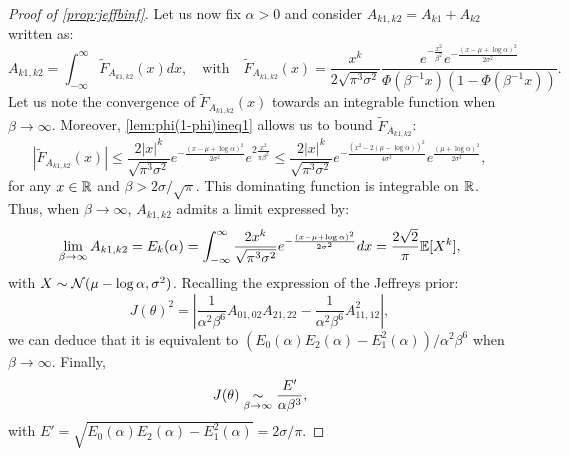 \begin{proof}[Proof of \cref{prop:jeffbinf}]
Let us now fix $\alpha>0$ and consider $A_{k1,k2}= A_{k1}+A_{k2}$ written as:
\begin{equation}
   A_{k1,k2} = \int_{-\infty}^\infty \tilde F_{A_{k1,k2}}(x)dx, \quad\text{with}\quad
    \tilde F_{A_{k1,k2}}(x) = \frac{x^k}{2\sqrt{\pi^3\sigma^2}}\frac{e^{-\frac{x^2}{\beta^2}}e^{-\frac{(x-\mu+\log\alpha)^2}{2\sigma^2}}}{\Phi(\beta^{-1}x)(1-\Phi(\beta^{-1}x))}.
\end{equation}
Let us note the convergence of $\tilde F_{A_{k1,k2}}(x)$ towards %
an integrable function when $\beta\to\infty$.
Moreover, \cref{lem:phi(1-phi)ineq1} allows us to bound $\tilde F_{A_{k1,k2}}$:
\begin{equation}
    |\tilde F_{A_{k1,k2}}(x)|\leq \frac{2|x|^k}{\sqrt{\pi^3\sigma^2}}e^{-\frac{(x-\mu+\log\alpha)^2}{2\sigma^2}} e^{2\frac{x^2}{\pi\beta^2}} 
        \leq \frac{2|x|^k}{\sqrt{\pi^3\sigma^2}} e^{-\frac{(x^2-2(\mu-\log\alpha))^2}{4\sigma^2}} e^{\frac{(\mu+\log\alpha)^2}{2\sigma^2}} ,
\end{equation}
for any $x\in\mathbb{R}$ and $\beta>2\sigma/\sqrt{\pi}$. This dominating function is integrable on $\mathbb{R}$. Thus, when $\beta\to\infty$, $A_{k1,k2}$ admits a limit expressed by:
\begin{equation}
    \lim_{\beta\rightarrow\infty}A_{k1,k2} = E_k(\alpha) = \int_{-\infty}^\infty\frac{2x^k}{\sqrt{\pi^3\sigma^2}}e^{-\frac{(x-\mu+\log\alpha)^2}{2\sigma^2}} dx= \frac{2\sqrt{2}}{\pi}\mathbb{E}[X^k] ,
\end{equation}
with $X\sim\mathcal{N}(\mu-\log\alpha,\sigma^2)$.
Recalling the expression of the Jeffreys prior:
    \begin{equation}
        J(\theta)^2 = \left|\frac{1}{\alpha^2\beta^6}A_{01,02}A_{21,22} - \frac{1}{\alpha^2\beta^6}A_{11,12}^2\right| ,
    \end{equation}
    we can deduce that it is equivalent to $(E_0(\alpha)E_2(\alpha)-E_1^2(\alpha))/\alpha^2\beta^6$ when $\beta\to\infty$.
    Finally,
    \begin{equation}
        J(\theta)\underset{\beta\rightarrow\infty}{\sim}\frac{E'}{\alpha\beta^3} ,
    \end{equation}
with $E'=\sqrt{E_0(\alpha)E_2(\alpha)-E_1^2(\alpha)} = 2 \sigma /\pi$.

\end{proof}



